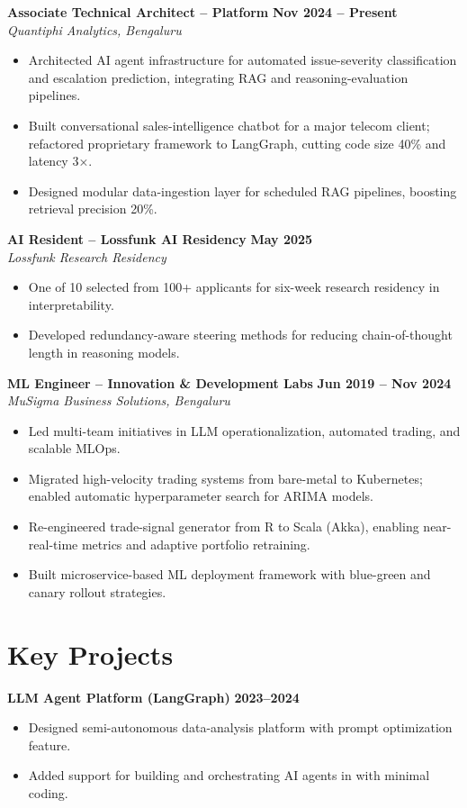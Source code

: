 \documentclass[11pt]{article}
\begin{document}
\textbf{Associate Technical Architect – Platform} \hfill \textbf{Nov 2024 – Present}\\
\textit{Quantiphi Analytics, Bengaluru}
\begin{itemize}[leftmargin=*,nosep]
\item Architected AI agent infrastructure for automated issue-severity classification and escalation prediction, integrating RAG and reasoning-evaluation pipelines.
\item Built conversational sales-intelligence chatbot for a major telecom client; refactored proprietary framework to LangGraph, cutting code size 40\% and latency 3×.
\item Designed modular data-ingestion layer for scheduled RAG pipelines, boosting retrieval precision 20\%.
\end{itemize}

\textbf{AI Resident – Lossfunk AI Residency} \hfill \textbf{May 2025}\\
\textit{Lossfunk Research Residency}
\begin{itemize}[leftmargin=*,nosep]
\item One of 10 selected from 100+ applicants for six-week research residency in interpretability.
\item Developed redundancy-aware steering methods for reducing chain-of-thought length in reasoning models.
\end{itemize}

\textbf{ML Engineer – Innovation \& Development Labs} \hfill \textbf{Jun 2019 – Nov 2024}\\
\textit{MuSigma Business Solutions, Bengaluru}
\begin{itemize}[leftmargin=*,nosep]
\item Led multi-team initiatives in LLM operationalization, automated trading, and scalable MLOps.
\item Migrated high-velocity trading systems from bare-metal to Kubernetes; enabled automatic hyperparameter search for ARIMA models.
\item Re-engineered trade-signal generator from R to Scala (Akka), enabling near-real-time metrics and adaptive portfolio retraining.
\item Built microservice-based ML deployment framework with blue-green and canary rollout strategies.
\end{itemize}

\section{Key Projects}
\textbf{LLM Agent Platform (LangGraph)} \hfill \textbf{2023–2024}\\
\begin{itemize}[leftmargin=*,nosep]
\item Designed semi-autonomous data-analysis platform with prompt optimization feature.
\item Added support for building and orchestrating AI agents in with minimal coding.
\end{itemize}
\end{document}

